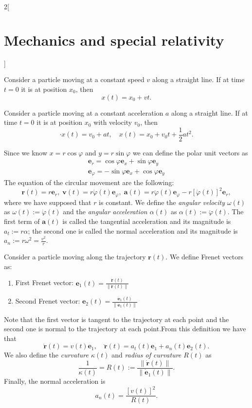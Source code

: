 \documentclass[class=article,10pt,crop=false]{standalone}
\begin{document}
\begin{multicols}{2}[\section{Mechanics and special relativity}]
\begin{concept}
Consider a particle moving at a constant speed $v$ along a straight line. If at time $t=0$ it is at position $x_0$, then $$x(t)=x_0+vt.$$
\end{concept}
\begin{concept}
Consider a particle moving at a constant acceleration $a$ along a straight line. If at time $t=0$ it is at position $x_0$ with velocity $v_0$, then $$\cdot{x}(t)=v_0+at,\quad x(t)=x_0+v_0t+\frac{1}{2}at^2.$$
\end{concept}
\begin{concept}
Since we know $x=r\cos\varphi$ and $y=r\sin \varphi$ we can define the polar unit vectors as
\begin{gather*}
    \boldsymbol{e}_r=\cos\varphi\boldsymbol{e}_x+\sin\varphi\boldsymbol{e}_y\\
    \boldsymbol{e}_\varphi=-\sin\varphi\boldsymbol{e}_x+\cos\varphi\boldsymbol{e}_y
\end{gather*}
The equation of the circular movement are the following: $$\boldsymbol{r}(t)=r\boldsymbol{e}_r,\;\boldsymbol{v}(t)=r\dot{\varphi}(t)\boldsymbol{e}_\varphi,\;\boldsymbol{a}(t)=r\ddot{\varphi}(t)\boldsymbol{e}_\varphi-r\left[\dot{\varphi}(t)\right]^2\boldsymbol{e}_r,$$ where we have supposed that $r$ is constant. We define the \textit{angular velocity $\omega(t)$} as $\omega(t):=\dot{\varphi}(t)$ and the \textit{angular acceleration $\alpha(t)$} as $\alpha(t):=\ddot{\varphi}(t)$. The first term of $\boldsymbol{a}(t)$ is called the tangential acceleration and its magnitude is $a_t:=r\alpha$; the second one is called the normal acceleration and its magnitude is $a_n:=r\omega^2=\frac{v^2}{r}$.
\end{concept}
\begin{concept}
Consider a particle moving along the trajectory $\boldsymbol{r}(t)$. We define Frenet vectors as:
\begin{enumerate}
    \item First Frenet vector: $\displaystyle\boldsymbol{e}_1(t)=\frac{\dot{\boldsymbol{r}}(t)}{\|\dot{\boldsymbol{r}}(t)\|}$
    \item Second Frenet vector: $\displaystyle\boldsymbol{e}_2(t)=\frac{\dot{\boldsymbol{e}}_1(t)}{\|\dot{\boldsymbol{e}}_1(t)\|}$
\end{enumerate}
Note that the first vector is tangent to the trajectory at each point and the second one is normal to the trajectory at each point.\newline From this definition we have that $$\dot{\boldsymbol{r}}(t)=v(t)\boldsymbol{e}_1,\quad\ddot{\boldsymbol{r}}(t)=a_t(t)\boldsymbol{e}_1+a_n(t)\boldsymbol{e}_2(t).$$ We also define the \textit{curvature $\kappa(t)$} and \textit{radius of curvature $R(t)$} as $$\frac{1}{\kappa(t)}=R(t):=\frac{\|\dot{\boldsymbol{r}}(t)\|}{\|\dot{\boldsymbol{e}}_1(t)\|}.$$ Finally, the normal acceleration is $$a_n(t)=\frac{\left[v(t)\right]^2}{R(t)}.$$

\end{concept}
\end{multicols}
\end{document}
